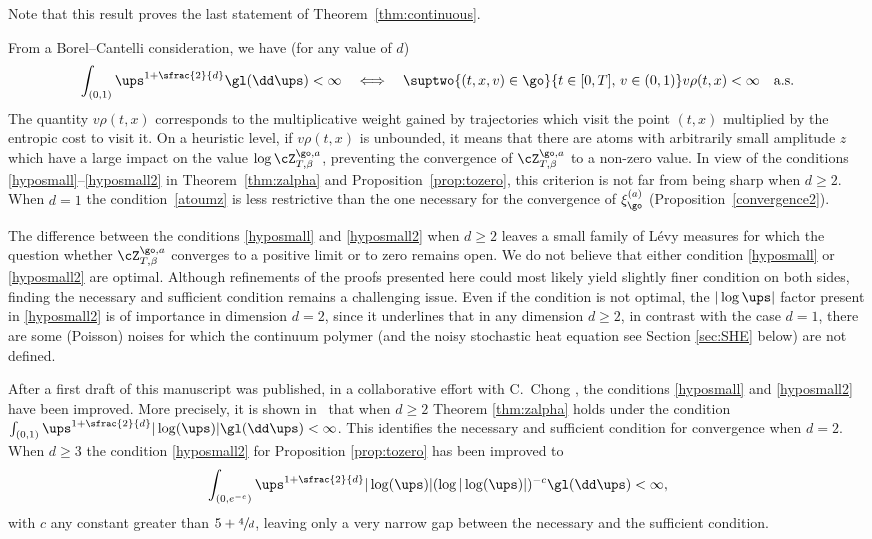 Note that this result proves the last statement of Theorem~\ref{thm:continuous}.

\begin{rem}
From a Borel--Cantelli consideration, we have (for any value of $d$)
\begin{equation}\label{atoumz}
\int_{(0,1)} \ups^{1+\sfrac{2}{d}} \gl(\dd \ups)<\infty \quad \Longleftrightarrow \quad
\suptwo{(t,x,v)\in \go}{ t\in [0,T],\, v\in(0,1)} v\rho(t,x)<\infty \quad \text{a.s.}
\end{equation}
The quantity $v\rho(t,x)$ corresponds to the multiplicative weight gained by trajectories which visit the point
$(t,x)$ multiplied by the entropic cost to visit it.
On a heuristic level, if $v\rho(t,x)$ is unbounded, it means that there are atoms with arbitrarily small amplitude $z$ which have a large impact on the value $\log \cZ^{\go,a}_{T,\beta}$, preventing the convergence of $\cZ^{\go,a}_{T,\beta}$ to a non-zero value.
In view of the conditions \eqref{hyposmall}--\eqref{hyposmall2} in
Theorem~\ref{thm:zalpha} and Proposition~\ref{prop:tozero}, this criterion is not far from being sharp when $d\ge 2$.
When $d=1$ the condition~\eqref{atoumz} is less restrictive than the one necessary for the convergence of $\xi^{(a)}_{\go}$ (\cf Proposition~\ref{convergence2}).
\end{rem}

\begin{rem}
The difference between the conditions \eqref{hyposmall} and \eqref{hyposmall2} when $d\ge 2$ leaves a small family of Lévy measures for which the question whether $\cZ^{\go,a}_{T,\beta}$ converges to a positive limit or to zero remains open. We do not believe that either condition \eqref{hyposmall} or \eqref{hyposmall2} are optimal. Although refinements of the proofs presented here could most likely yield slightly finer condition on both sides, finding the necessary and sufficient condition remains a challenging issue.
Even if the condition is not optimal, the $|\log \ups|$ factor present in \eqref{hyposmall2}
is of importance in dimension $d=2$, since it underlines that in any dimension $d\geq 2$, in contrast with the case $d=1$, there are some (Poisson) noises for which the continuum polymer (and the noisy stochastic heat equation see Section \ref{sec:SHE} below) are not defined.
\end{rem}

\begin{rem}
After a first draft of this manuscript was published, in a collaborative effort with C.\ Chong \cite{BCL21}, the conditions \eqref{hyposmall} and
\eqref{hyposmall2} have been improved. More precisely,
it is shown in~\cite{BCL21} that when $d\ge 2$
Theorem \ref{thm:zalpha} holds under the condition
$\int_{(0,1)} \ups^{1+\sfrac{2}{d}}|\log (\ups)| \gl(\dd \ups)<\infty$.
This identifies the necessary and sufficient condition for convergence when $d=2$. When $d\ge 3$ the condition \eqref{hyposmall2} for Proposition \ref{prop:tozero} has been improved to
\[
\int_{(0,e^{-e})} \ups^{1+\sfrac{2}{d}}|\log (\ups)| (\log |\log (\ups)|)^{-c}\gl(\dd \ups)<\infty,
\]
with $c$ any constant greater than $5+\sfrac4d$,
leaving only a very narrow gap between the necessary and the sufficient condition.
\end{rem}

